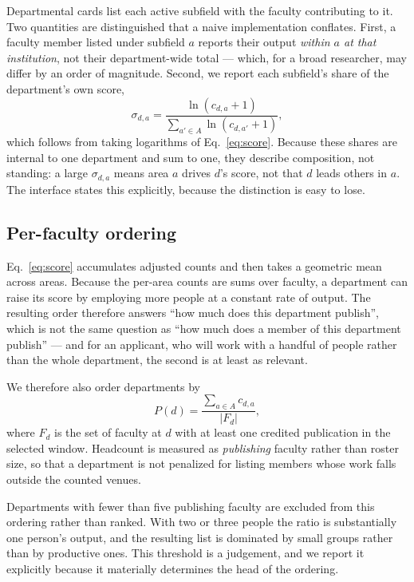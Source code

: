 \documentclass[11pt]{article}
\begin{document}
Departmental cards list each active subfield with the faculty contributing to
it. Two quantities are distinguished that a naive implementation conflates.
First, a faculty member listed under subfield $a$ reports their output
\emph{within $a$ at that institution}, not their department-wide total ---
which, for a broad researcher, may differ by an order of magnitude. Second, we
report each subfield's share of the department's own score,
\begin{equation}
  \sigma_{d,a} = \frac{\ln(c_{d,a} + 1)}{\sum_{a' \in A} \ln(c_{d,a'} + 1)},
\end{equation}
which follows from taking logarithms of Eq.~\ref{eq:score}. Because these
shares are internal to one department and sum to one, they describe
composition, not standing: a large $\sigma_{d,a}$ means area $a$ drives $d$'s
score, not that $d$ leads others in $a$. The interface states this explicitly,
because the distinction is easy to lose.

\subsection{Per-faculty ordering}
\label{sec:percapita}

Eq.~\ref{eq:score} accumulates adjusted counts and then takes a geometric mean
across areas. Because the per-area counts are sums over faculty, a department
can raise its score by employing more people at a constant rate of output. The
resulting order therefore answers ``how much does this department publish'',
which is not the same question as ``how much does a member of this department
publish'' --- and for an applicant, who will work with a handful of people
rather than the whole department, the second is at least as relevant.

We therefore also order departments by
\begin{equation}
  P(d) = \frac{\sum_{a \in A} c_{d,a}}{|F_d|},
\end{equation}
where $F_d$ is the set of faculty at $d$ with at least one credited publication
in the selected window. Headcount is measured as \emph{publishing} faculty
rather than roster size, so that a department is not penalized for listing
members whose work falls outside the counted venues.

Departments with fewer than five publishing faculty are excluded from this
ordering rather than ranked. With two or three people the ratio is
substantially one person's output, and the resulting list is dominated by small
groups rather than by productive ones. This threshold is a judgement, and we
report it explicitly because it materially determines the head of the ordering.
\end{document}
